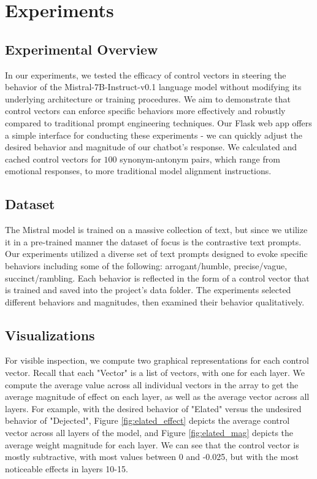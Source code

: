 \documentclass[11pt,a4paper]{article}
\begin{document}
\section{Experiments}

\subsection{Experimental Overview}
In our experiments, we tested the efficacy of control vectors in steering the behavior of the Mistral-7B-Instruct-v0.1 language model without modifying its underlying architecture or training procedures. We aim to demonstrate that control vectors can enforce specific behaviors more effectively and robustly compared to traditional prompt engineering techniques. Our Flask web app offers a simple interface for conducting these experiments - we can quickly adjust the desired behavior and magnitude of our chatbot's response. We calculated and cached control vectors for $100$ synonym-antonym pairs, which range from emotional responses, to more traditional model alignment instructions.

\subsection{Dataset}
The Mistral model is trained on a massive collection of text, but since we utilize it in a pre-trained manner the dataset of focus is the contrastive text prompts. Our experiments utilized a diverse set of text prompts designed to evoke specific behaviors including some of the following: arrogant/humble, precise/vague, succinct/rambling. Each behavior is reflected in the form of a control vector that is trained and saved into the project's data folder. The experiments selected different behaviors and magnitudes, then examined their behavior qualitatively. 

%


\subsection{Visualizations}
For visible inspection, we compute two graphical representations for each control vector. Recall that each "Vector" is a list of vectors, with one for each layer. We compute the average value across all individual vectors in the array to get the average magnitude of effect on each layer, as well as the average vector across all layers. For example, with the desired behavior of "Elated" versus the undesired behavior of "Dejected", Figure \ref{fig:elated_effect} depicts the average control vector across all layers of the model, and Figure \ref{fig:elated_mag} depicts the average weight magnitude for each layer. We can see that the control vector is mostly subtractive, with most values between 0 and -0.025, but with the most noticeable effects in layers 10-15.
\end{document}

